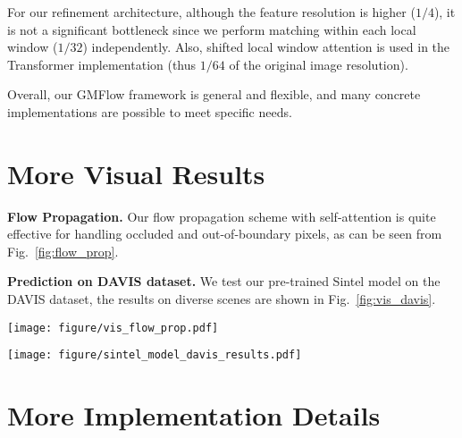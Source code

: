 \documentclass[10pt,twocolumn,letterpaper]{article}
\begin{document}
For our refinement architecture, although the feature resolution is higher ($1/4$), it is not a significant bottleneck since we perform matching within each local window ($1/32$) independently. Also, shifted local window attention is used in the Transformer implementation (thus $1/64$ of the original image resolution).


Overall, our GMFlow framework is general and flexible, and many concrete implementations are possible to meet specific needs.






\section{More Visual Results}

{\bf Flow Propagation.} Our flow propagation scheme with self-attention is quite effective for handling occluded and out-of-boundary pixels, as can be seen from Fig.~\ref{fig:flow_prop}.

{\bf Prediction on DAVIS dataset.} We test our pre-trained Sintel model on the DAVIS \cite{perazzi2016benchmark} dataset, the results on diverse scenes are shown in Fig.~\ref{fig:vis_davis}.







\begin{figure*}[t]
    \centering
    \texttt{[image: figure/vis\_flow\_prop.pdf]}
    \caption{Our flow propagation (prop.) scheme significantly improves the performance of occluded and out-of-boundary pixels.}
    \label{fig:flow_prop}
\end{figure*}






\begin{figure*}[t]
    \centering
    \texttt{[image: figure/sintel\_model\_davis\_results.pdf]}
    \caption{Visual results on DAVIS dataset.}
    \label{fig:vis_davis}
\end{figure*}






\section{More Implementation Details}
\end{document}
